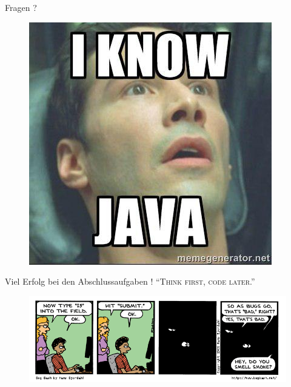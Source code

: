 \documentclass[18pt]{beamer}
\newcommand{\quotes}[1]{``#1''}
\begin{document}
\appendix
\beginbackup

\begin{frame}{Fragen ?}
    \begin{figure}
        \includegraphics[scale=.4]{img/iknowjava.jpg}
    \end{figure}
\end{frame}

\begin{frame}{Viel Erfolg bei den Abschlussaufgaben !}
    \center
    \textsc{\quotes{Think first, code later.}}
    \begin{figure}
        \includegraphics[scale=.6]{img/bug-bash20050521.png}
    \end{figure}
\end{frame}

\backupend
\end{document}
